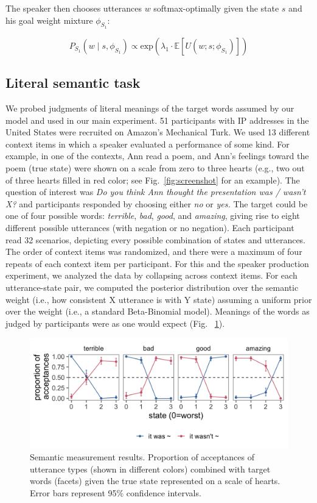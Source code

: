 \documentclass[9pt,twocolumn,twoside,lineno]{main_class_file}
\begin{document}
{\noindent The speaker then chooses utterances $w$ softmax-optimally given the state $s$ and his goal weight mixture $\phi_{S_1}$: 

\begin{equation} 
P_{S_1}(w \mid s, \phi_{S_1}) \propto \mathrm{exp}(\lambda_{1} \cdot \mathbb{E}[U(w; s; \phi_{S_1})])
\end{equation}


\subsection*{Literal semantic task}\label{literal-semantic-task}

We probed judgments of literal meanings of the target words assumed by
our model and used in our main experiment. 51 participants with IP
addresses in the United States were recruited on Amazon's Mechanical
Turk. We used 13 different context items in which a speaker
evaluated a performance of some kind. For example, in one of the
contexts, Ann read a poem, and Ann's feelings toward the
poem (true state) were shown on a scale from zero to three
hearts (e.g., two out of three hearts filled in red color; see
Fig.~\ref{fig:screenshot} for an example). The
question of interest was \emph{Do you think Ann thought the
presentation was / wasn't X?} and participants responded by choosing
either \emph{no} or \emph{yes.} The target could be one of four
possible words: \emph{terrible}, \emph{bad}, \emph{good}, and
\emph{amazing}, giving rise to eight different possible utterances (with
negation or no negation). Each participant read 32 scenarios, depicting
every possible combination of states and utterances. The order of
context items was randomized, and there were a maximum of four repeats
of each context item per participant. For this and the speaker
production experiment, we analyzed the data by collapsing across context
items. For each utterance-state pair, we computed the posterior
distribution over the semantic weight (i.e., how consistent X utterance
is with Y state) assuming a uniform prior over the weight (i.e., a
standard Beta-Binomial model). Meanings of the words as judged by
participants were as one would expect (Fig. ~\ref{fig:litsem}).

\begin{figure}[!h]
\includegraphics[width=0.9\columnwidth]{fig/litsem-1}
\centering \caption{Semantic measurement results. Proportion of acceptances of utterance types (shown in different colors) combined with target words (facets) given the true state represented on a scale of hearts. Error bars represent 95\% confidence intervals.}\label{fig:litsem}
\end{figure}

}
\end{document}
